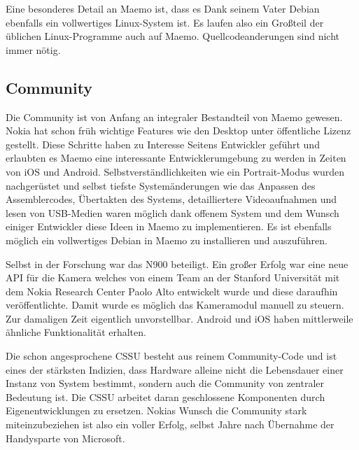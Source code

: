 Eine besonderes Detail an Maemo ist, dass es Dank seinem Vater Debian ebenfalls ein vollwertiges Linux-System ist. Es laufen also ein Großteil der üblichen Linux-Programme auch auf Maemo. Quellcodeanderungen sind nicht immer nötig.\\ 

\subsection{Community}
Die Community ist von Anfang an integraler Bestandteil von Maemo gewesen. Nokia hat schon früh wichtige Features wie den Desktop unter öffentliche Lizenz gestellt\cite{online:maemo-hildon}. Diese Schritte haben zu Interesse Seitens Entwickler geführt und erlaubten es Maemo eine interessante Entwicklerumgebung zu werden in Zeiten von iOS und Android. Selbstverständlichkeiten wie ein Portrait-Modus wurden nachgerüstet\cite{online:maemo-portrait} und selbst tiefste Systemänderungen wie das Anpassen des Assemblercodes\cite{online:maemo-thumb}, Übertakten des Systems\cite{online:maemo-overclocking}, detailliertere Videoaufnahmen\cite{online:maemo-hdvideo} und lesen von USB-Medien\cite{online:maemo-usbhost}  waren möglich dank offenem System und dem Wunsch einiger Entwickler diese Ideen in Maemo zu implementieren. Es ist ebenfalls möglich ein vollwertiges Debian in Maemo zu installieren und auszuführen\cite{online:maemo-easydebian}\cite{online:maemo-easydebianwiki}.

Selbst in der Forschung war das N900 beteiligt. Ein großer Erfolg war eine neue API für die Kamera welches von einem Team an der Stanford Universität mit dem Nokia Research Center Paolo Alto entwickelt wurde und diese daraufhin veröffentlichte\cite{online:maemo-fcam}. Damit wurde es möglich das Kameramodul manuell zu steuern. Zur damaligen Zeit eigentlich unvorstellbar. Android und iOS haben mittlerweile ähnliche Funktionalität erhalten\cite{online:maemo-fcamlegacy}.

Die schon angesprochene CSSU besteht aus reinem Community-Code und ist eines der stärksten Indizien, dass Hardware alleine nicht die Lebensdauer einer Instanz von System bestimmt, sondern auch die Community von zentraler Bedeutung ist. Die CSSU arbeitet daran geschlossene Komponenten durch Eigenentwicklungen zu ersetzen. Nokias Wunsch die Community stark miteinzubeziehen ist also ein voller Erfolg, selbst Jahre nach Übernahme der Handysparte von Microsoft\cite{online:nokia-microsoft}.\\

